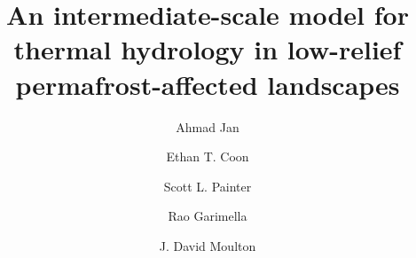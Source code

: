 \documentclass[review,11pt]{elsarticle}
\begin{document}
\begin{frontmatter}

\title{An intermediate-scale model for thermal hydrology in low-relief permafrost-affected landscapes}

\author[ornl]{Ahmad Jan } \author[lanl1]{Ethan T. Coon} \author[ornl]{Scott L. Painter} \author[lanl2]{Rao Garimella} \author[lanl2]{J. David Moulton}

\address[ornl]{Climate Change Science Institute and Environmental Sciences Division, Oak Ridge National Laboratory, Oak Ridge, Tennessee, USA} 
\address[lanl1]{Computational Earth Sciences Group, Earth and Environmental Sciences Division, Los Alamos National Laboratory, Los Alamos, New Mexico, USA} 
\address[lanl2]{Applied Mathematics and Plasma Physics Group, Theoretical Division, Los Alamos National Laboratory, Los Alamos, New Mexico, USA} 









\end{frontmatter}
\end{document}
